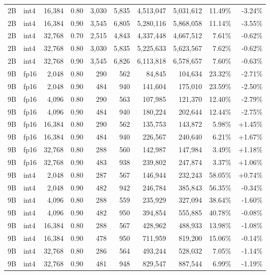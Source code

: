 \begin{longtable}{@{}llrrrrrrrr@{}}
2B & int4 & 16,384 & 0.80 & 3,030 & 5,835 & 4,513,047 & 5,031,612 & 11.49\% & -3.24\% \\
2B & int4 & 16,384 & 0.90 & 3,545 & 6,805 & 5,280,116 & 5,868,058 & 11.14\% & -3.55\% \\
2B & int4 & 32,768 & 0.70 & 2,515 & 4,843 & 4,337,448 & 4,667,512 & 7.61\% & -0.62\% \\
2B & int4 & 32,768 & 0.80 & 3,030 & 5,835 & 5,225,633 & 5,623,567 & 7.62\% & -0.62\% \\
2B & int4 & 32,768 & 0.90 & 3,545 & 6,826 & 6,113,818 & 6,578,657 & 7.60\% & -0.63\% \\
9B & fp16 & 2,048 & 0.80 & 290 & 562 & 84,845 & 104,634 & 23.32\% & -2.71\% \\
9B & fp16 & 2,048 & 0.90 & 484 & 940 & 141,604 & 175,010 & 23.59\% & -2.50\% \\
9B & fp16 & 4,096 & 0.80 & 290 & 563 & 107,985 & 121,370 & 12.40\% & -2.79\% \\
9B & fp16 & 4,096 & 0.90 & 484 & 940 & 180,224 & 202,644 & 12.44\% & -2.75\% \\
9B & fp16 & 16,384 & 0.80 & 290 & 562 & 135,753 & 143,872 & 5.98\% & +1.45\% \\
9B & fp16 & 16,384 & 0.90 & 484 & 940 & 226,567 & 240,640 & 6.21\% & +1.67\% \\
9B & fp16 & 32,768 & 0.80 & 288 & 560 & 142,987 & 147,984 & 3.49\% & +1.18\% \\
9B & fp16 & 32,768 & 0.90 & 483 & 938 & 239,802 & 247,874 & 3.37\% & +1.06\% \\
9B & int4 & 2,048 & 0.80 & 287 & 567 & 146,944 & 232,243 & 58.05\% & +0.74\% \\
9B & int4 & 2,048 & 0.90 & 482 & 942 & 246,784 & 385,843 & 56.35\% & -0.34\% \\
9B & int4 & 4,096 & 0.80 & 288 & 559 & 235,929 & 327,094 & 38.64\% & -1.60\% \\
9B & int4 & 4,096 & 0.90 & 482 & 950 & 394,854 & 555,885 & 40.78\% & -0.08\% \\
9B & int4 & 16,384 & 0.80 & 288 & 567 & 428,962 & 488,933 & 13.98\% & -1.08\% \\
9B & int4 & 16,384 & 0.90 & 478 & 950 & 711,959 & 819,200 & 15.06\% & -0.14\% \\
9B & int4 & 32,768 & 0.80 & 286 & 564 & 493,244 & 528,032 & 7.05\% & -1.14\% \\
9B & int4 & 32,768 & 0.90 & 481 & 948 & 829,547 & 887,544 & 6.99\% & -1.19\% \\
\end{longtable}
\endgroup
